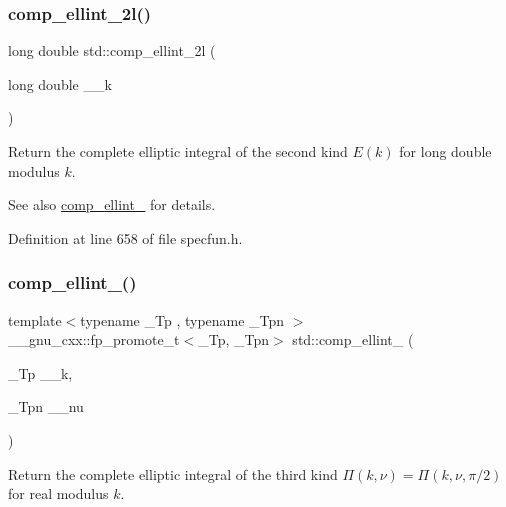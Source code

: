 \subsubsection{\texorpdfstring{comp\+\_\+ellint\+\_\+2l()}{comp\_ellint\_2l()}}
{\footnotesize\ttfamily long double std\+::comp\+\_\+ellint\+\_\+2l (\begin{DoxyParamCaption}\item[{long double}]{\+\_\+\+\_\+k }\end{DoxyParamCaption})\hspace{0.3cm}{\ttfamily [inline]}}

Return the complete elliptic integral of the second kind $ E(k) $ for {\ttfamily long double} modulus $ k $.

\begin{DoxySeeAlso}{See also}
\hyperlink{group__cxx17__math__spec__func_gaadf288465eea84ec609d93de96200aaa}{comp\+\_\+ellint\+\_} for details. 
\end{DoxySeeAlso}


Definition at line 658 of file specfun.\+h.

\mbox{\label{group__cxx17__math__spec__func_ga80419d323d3231870bd588525e818974}} 
\subsubsection{\texorpdfstring{comp\+\_\+ellint\+\_()}{comp\_ellint\_3()}}
{\footnotesize\ttfamily template$<$typename \+\_\+\+Tp , typename \+\_\+\+Tpn $>$ \\
\+\_\+\+\_\+gnu\+\_\+cxx\+::fp\+\_\+promote\+\_\+t$<$\+\_\+\+Tp, \+\_\+\+Tpn$>$ std\+::comp\+\_\+ellint\+\_ (\begin{DoxyParamCaption}\item[{\+\_\+\+Tp}]{\+\_\+\+\_\+k,  }\item[{\+\_\+\+Tpn}]{\+\_\+\+\_\+nu }\end{DoxyParamCaption})\hspace{0.3cm}{\ttfamily [inline]}}

Return the complete elliptic integral of the third kind $ \Pi(k,\nu) = \Pi(k,\nu,\pi/2) $ for real modulus $ k $.

